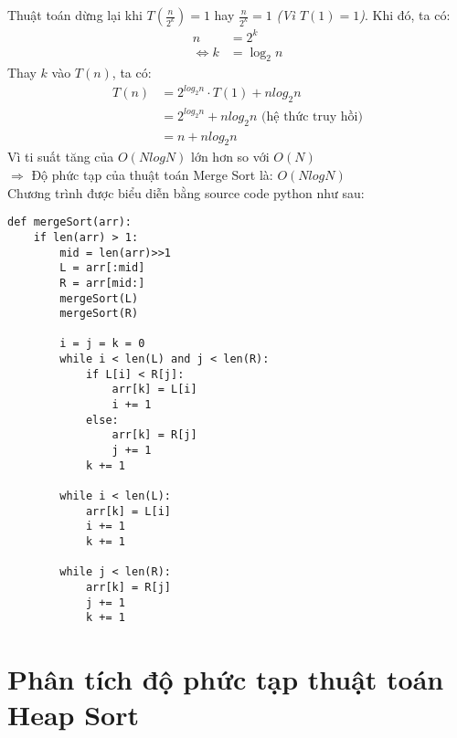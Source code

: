 \documentclass{article}
\begin{document}
\begin{multicols}{2}
Thuật toán dừng lại khi $T(\frac{n}{2^k}) = 1$ hay $\frac{n}{2^k} = 1$ \textit{(Vì $T(1) = 1$)}. Khi đó, ta có:
\begin{align*}
    n &= 2^k\\
    \Leftrightarrow  k &= \log_2n
\end{align*}
Thay $k$ vào $T(n)$, ta có: 
\begin{align*}
    T(n) &= 2^{log_2n}\cdot T(1) + nlog_2n\\
    &= 2^{log_2n} + nlog_2n \text{ (hệ thức truy hồi)}\\
    &= n + nlog_2n
\end{align*} 
Vì ti suất tăng của $O(NlogN)$ lớn hơn so với $O(N)$\\
$\Rightarrow$ Độ phức tạp của thuật toán Merge Sort là: $O(NlogN)$\\

Chương trình được biểu diễn bằng source code python như sau: 

\begin{verbatim}
def mergeSort(arr):
    if len(arr) > 1:
        mid = len(arr)>>1   
        L = arr[:mid]
        R = arr[mid:]
        mergeSort(L)
        mergeSort(R)
 
        i = j = k = 0
        while i < len(L) and j < len(R):
            if L[i] < R[j]:
                arr[k] = L[i]
                i += 1
            else:
                arr[k] = R[j]
                j += 1
            k += 1
 
        while i < len(L):
            arr[k] = L[i]
            i += 1
            k += 1
 
        while j < len(R):
            arr[k] = R[j]
            j += 1
            k += 1
\end{verbatim}



\end{multicols}

\section{Phân tích độ phức tạp thuật toán Heap Sort}
\end{document}
